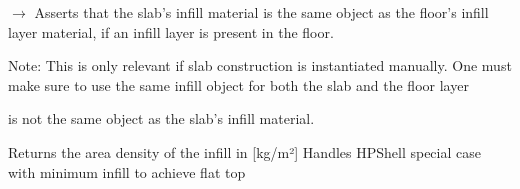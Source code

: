 \documentclass[a4paper,11pt,german]{sphinxmanual}
\begin{document}
\begin{fulllineitems}
\begin{fulllineitems}
\end{fulllineitems}


\begin{fulllineitems}
\label{\detokenize{api/slab_construction:slab_construction.slab_construction.SlabConstruction.assert_infill_compatibility}}
\pysigstartsignatures
\pysiglinewithargsret
{}
{}
{{ $\rightarrow$ }}
\pysigstopsignatures
\sphinxAtStartPar
Asserts that the slab’s infill material is the same object as the floor’s
infill layer material, if an infill layer is present in the floor.

\sphinxAtStartPar
Note: This is only relevant if slab construction is instantiated manually.
One must make sure to use the same infill object for both the slab and the floor layer
\begin{description}
\begin{description}
\sphinxAtStartPar
is not the same object as the slab’s infill material.

\end{description}

\end{description}

\end{fulllineitems}


\begin{fulllineitems}
\label{\detokenize{api/slab_construction:slab_construction.slab_construction.SlabConstruction.infill_area_density_kg_m2}}
\pysigstartsignatures
\pysiglinewithargsret
{}
{}
{}
\pysigstopsignatures
\sphinxAtStartPar
Returns the area density of the infill in {[}kg/m²{]}
Handles HPShell special case with minimum infill to achieve flat top


\end{fulllineitems}
\end{fulllineitems}
\end{document}
